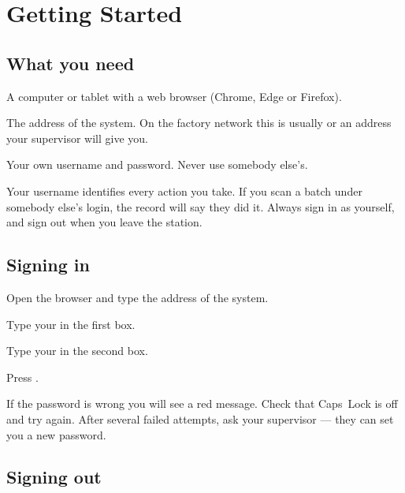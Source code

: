 \chapter{Getting Started}

\section{What you need}

\begin{bullets}
  \item A computer or tablet with a web browser (Chrome, Edge or Firefox).
  \item The address of the system. On the factory network this is usually
         or an address your supervisor will give you.
  \item Your own username and password. Never use somebody else's.
\end{bullets}

\begin{stopbox}
Your username identifies every action you take. If you scan a batch under
somebody else's login, the record will say they did it. Always sign in as
yourself, and sign out when you leave the station.
\end{stopbox}

\section{Signing in}

\begin{steps}
  \item Open the browser and type the address of the system.
  \item Type your  in the first box.
  \item Type your  in the second box.
  \item Press .
\end{steps}


If the password is wrong you will see a red message. Check that Caps~Lock is
off and try again. After several failed attempts, ask your supervisor --- they
can set you a new password.

\section{Signing out}

